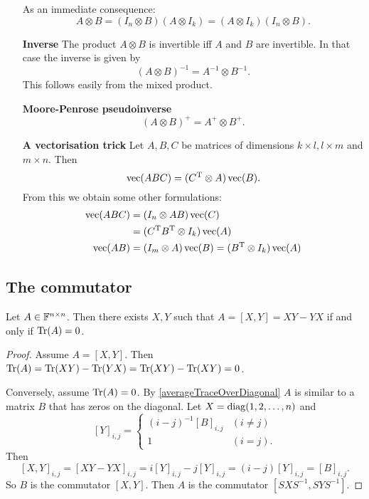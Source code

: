 \begin{itemize}
As an immediate consequence:
\[ A\otimes B = (I_n\otimes B)(A\otimes I_k) = (A\otimes I_k)(I_n \otimes B). \]

\item[\textbf{Inverse}]
The product $A\otimes B$ is invertible iff $A$ and $B$ are invertible. In that case the inverse is given by
\[ (A\otimes B)^{-1} = A^{-1}\otimes B^{-1}. \]
This follows easily from the mixed product.
\item[\textbf{Moore-Penrose pseudoinverse}]
\[ (A\otimes B)^+ = A^+\otimes B^+. \]

\item[\textbf{A vectorisation trick}]
Let $A,B,C$ be matrices of dimensions $k\times l, l\times m$ and $m\times n$. Then
\[ \operatorname{vec}(ABC) = (C^{\mathrm{T}}\otimes A)\operatorname{vec}(B). \]
From this we obtain some other formulations:
\begin{align}
\operatorname{vec}(ABC) &= (I_n\otimes AB)\operatorname{vec}(C) \\
&= (C^{\mathrm{T}} B^{\mathrm{T}} \otimes I_k)\operatorname{vec}(A) \\
\operatorname{vec}(AB) &= (I_m\otimes A)\operatorname{vec}(B) = (B^{\mathrm{T}} \otimes I_k)\operatorname{vec}(A)
\end{align}
\end{itemize}

\subsection{The commutator}
\begin{theorem}
Let $A\in\mathbb{F}^{n\times n}$. Then there exists $X,Y$ such that $A=[X,Y] = XY-YX$ \textup{if and only if} $\operatorname{Tr}(A) = 0$.
\end{theorem}
\begin{proof}
Assume $A = [X,Y]$. Then $\operatorname{Tr}(A) = \operatorname{Tr}(XY) -\operatorname{Tr}(YX) = \operatorname{Tr}(XY) - \operatorname{Tr}(XY) = 0$.

Conversely, assume $\operatorname{Tr}(A) = 0$. By \ref{averageTraceOverDiagonal} $A$ is similar to a matrix $B$ that has zeros on the diagonal. Let $X = \operatorname{diag}(1,2,\ldots, n)$ and
\[ [Y]_{i,j} = \begin{cases}
(i-j)^{-1}[B]_{i,j} & (i\neq j) \\
1 & (i=j).
\end{cases} \]
Then
\[ [X,Y]_{i,j} = [XY-YX]_{i,j} = i[Y]_{i,j}-j[Y]_{i,j} = (i-j)[Y]_{i,j} = [B]_{i,j}. \]
So $B$ is the commutator $[X,Y]$. Then $A$ is the commutator $[SXS^{-1}, SYS^{-1}]$.
\end{proof}

